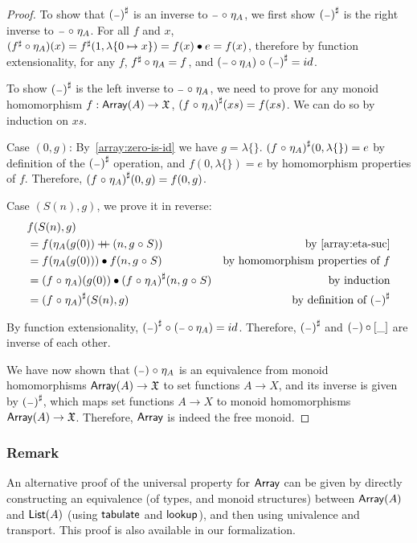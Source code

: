 \begin{proof}
    To show that ${({\scriptstyle{-}})}^{\sharp}$ is an inverse to ${\scriptstyle{-}} \mathrel{\circ} \eta_A$,
    we first show ${({\scriptstyle{-}})}^{\sharp}$ is the right inverse to ${\scriptstyle{-}} \mathrel{\circ} \eta_A$.
    For all $f$ and $x$, $({f}^{\sharp} \circ \eta_A)(x) = {f}^{\sharp}(1, \lambda\{0 \mapsto x\}) = f(x) \mathbin{\bullet} e = f(x)$,
    therefore by function extensionality, for any $f$, ${f}^{\sharp} \circ \eta_A = f$,
    and $({\scriptstyle{-}} \circ \eta_A) \mathrel{\circ} {({\scriptstyle{-}})}^{\sharp} = id$.

    To show ${({\scriptstyle{-}})}^{\sharp}$ is the left inverse to ${\scriptstyle{-}} \mathrel{\circ} \eta_A$, we need to prove
    for any monoid homomorphism $f : \operatorname{\mathsf{Array}}(A) \to \mathfrak{X}$, ${(f \mathrel{\circ} \eta_A)}^{\sharp}(xs) = f(xs)$.
    We can do so by induction on $xs$.

    Case $(0, g)$:
    By~\cref{array:zero-is-id} we have $g = \lambda\{\}$.
    ${(f \mathrel{\circ} \eta_A)}^{\sharp}(0, \lambda\{\}) = e$ by definition of the ${({\scriptstyle{-}})}^{\sharp}$ operation,
    and $f(0, \lambda\{\}) = e$ by homomorphism properties of $f$.
    Therefore, ${(f \mathrel{\circ} \eta_A)}^{\sharp}(0, g) = f(0, g)$.

    Case $(S(n), g)$, we prove it in reverse:
    \begin{align*}
         & f(S(n), g)                                                                                                     \\
         & = f(\eta_A(g(0)) \doubleplus (n, g \comp S))                        & \text{by~\cref{array:eta-suc}}           \\
         & = f(\eta_A(g(0))) \mult f(n, g \comp S)                             & \text{by homomorphism properties of $f$} \\
         & = (f \comp \eta_A)(g(0)) \mult \ext{(f \comp \eta_A)}(n, g \comp S) & \text{by induction}                      \\
         & = \ext{(f \comp \eta_A)}(S(n), g)                                   & \text{by definition of $\ext{(\blank)}$}
    \end{align*}

    By function extensionality, ${({\scriptstyle{-}})}^{\sharp} \mathrel{\circ} ({\scriptstyle{-}} \circ \eta_A) = id$.
    Therefore, ${({\scriptstyle{-}})}^{\sharp}$ and $({\scriptstyle{-}}) \circ [\_]$ are inverse of each other.

    We have now shown that $({\scriptstyle{-}}) \mathrel{\circ} \eta_A$ is an equivalence from
    monoid homomorphisms $\operatorname{\mathsf{Array}}(A) \to \mathfrak{X}$
    to set functions $A \to X$, and its inverse is given by ${({\scriptstyle{-}})}^{\sharp}$, which maps set
    functions $A \to X$ to monoid homomorphisms $\operatorname{\mathsf{Array}}(A) \to \mathfrak{X}$. Therefore, $\operatorname{\mathsf{Array}}$ is indeed
    the free monoid.

\end{proof}

\subsubsection*{Remark}
An alternative proof of the universal property for $\operatorname{\mathsf{Array}}$ can be given by directly constructing an equivalence (of
types, and monoid structures) between $\operatorname{\mathsf{Array}}(A)$ and $\operatorname{\mathsf{List}}(A)$ (using $\operatorname{\mathsf{tabulate}}$ and $\operatorname{\mathsf{lookup}}$), and then
using univalence and transport.
%
This proof is also available in our formalization.
